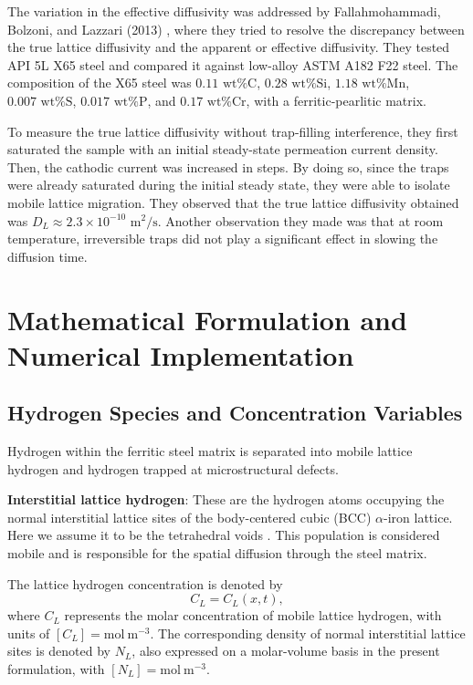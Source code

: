 \documentclass[a4paper,12pt,oneside]{report}
\begin{document}
The variation in the effective diffusivity was addressed by Fallahmohammadi, Bolzoni, and Lazzari (2013) \cite{Fallahmohammadi2013}, where they tried to resolve the discrepancy between the true lattice diffusivity and the apparent or effective diffusivity. They tested API 5L X65 steel and compared it against low-alloy ASTM A182 F22 steel. The composition of the X65 steel was $0.11\text{ wt\% C}$, $0.28\text{ wt\% Si}$, $1.18\text{ wt\% Mn}$, $0.007\text{ wt\% S}$, $0.017\text{ wt\% P}$, and $0.17\text{ wt\% Cr}$, with a ferritic-pearlitic matrix. 

To measure the true lattice diffusivity without trap-filling interference, they first saturated the sample with an initial steady-state permeation current density. Then, the cathodic current was increased in steps. By doing so, since the traps were already saturated during the initial steady state, they were able to isolate mobile lattice migration. They observed that the true lattice diffusivity obtained was $D_L \approx 2.3 \times 10^{-10} \text{ m}^2/\text{s}$. Another observation they made was that at room temperature, irreversible traps did not play a significant effect in slowing the diffusion time.
\chapter{Mathematical Formulation and Numerical Implementation}
\label{ch:formulation}

\section{Hydrogen Species and Concentration Variables}

Hydrogen within the ferritic steel matrix is separated into mobile lattice hydrogen and hydrogen trapped at microstructural defects.

\textbf{Interstitial lattice hydrogen}: These are the hydrogen atoms occupying the normal interstitial lattice sites of the body-centered cubic (BCC) $\alpha$-iron lattice. Here we assume it to be the tetrahedral voids \cite{KIUCHI1983961}. This population is considered mobile and is responsible for the spatial diffusion through the steel matrix.

The lattice hydrogen concentration is denoted by
\begin{equation}
C_L = C_L(x, t),
\label{eq:ch3_CL}
\end{equation}
where $C_L$ represents the molar concentration of mobile lattice hydrogen, with units of $[C_L] = \mathrm{mol~m^{-3}}$. The corresponding density of normal interstitial lattice sites is denoted by $N_L$, also expressed on a molar-volume basis in the present formulation, with $[N_L] = \mathrm{mol~m^{-3}}$.
\end{document}
